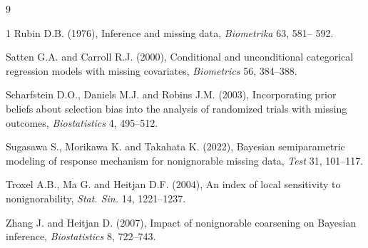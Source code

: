 \documentclass[twoside]{article}
\begin{document}
\begin{thebibliography}{9}
\begin{spacing}{1}
Rubin D.B. (1976), Inference and missing data, {\it Biometrika} 63,  581–
592.

Satten G.A. and Carroll R.J. (2000), Conditional and unconditional categorical
regression models with missing covariates, {\it Biometrics} 56,
384–388.


Scharfstein D.O., Daniels M.J. and Robins J.M. (2003), Incorporating
prior beliefs about selection bias into the analysis of randomized
trials with missing outcomes, {\it Biostatistics} 4, 495–512.
 

Sugasawa S., Morikawa K. and Takahata K. (2022), Bayesian semiparametric
modeling of response mechanism for nonignorable missing data, {\it Test}
31, 101–117.

Troxel A.B., Ma G. and Heitjan D.F. (2004), An index of local sensitivity
to nonignorability, {\it Stat. Sin.} 14, 1221–1237.

Zhang J. and Heitjan D. (2007), Impact of nonignorable coarsening on Bayesian
inference, {\it Biostatistics} 8, 722–743.
\end{spacing}
\end{thebibliography}
 
\end{document}
